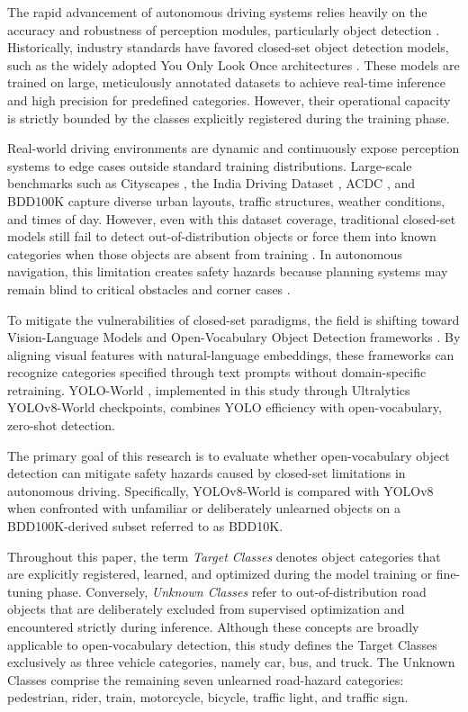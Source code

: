 \documentclass[conference]{IEEEtran}
\begin{document}
The rapid advancement of autonomous driving systems relies heavily on the accuracy and robustness of perception modules, particularly object detection \cite{Jebamikyous2022Autonomous, Pravallika2024Deep}. Historically, industry standards have favored closed-set object detection models, such as the widely adopted You Only Look Once architectures \cite{Redmon2015You, Terven2023A}. These models are trained on large, meticulously annotated datasets to achieve real-time inference and high precision for predefined categories. However, their operational capacity is strictly bounded by the classes explicitly registered during the training phase.

Real-world driving environments are dynamic and continuously expose perception systems to edge cases outside standard training distributions. Large-scale benchmarks such as Cityscapes \cite{Cordts2016Cityscapes}, the India Driving Dataset \cite{Varma2018IDD}, ACDC \cite{Sakaridis2021ACDC}, and BDD100K \cite{Yu2018BDD100K} capture diverse urban layouts, traffic structures, weather conditions, and times of day. However, even with this dataset coverage, traditional closed-set models still fail to detect out-of-distribution objects or force them into known categories when those objects are absent from training \cite{Dhamija2020The, Li2025Out-of-distribution}. In autonomous navigation, this limitation creates safety hazards because planning systems may remain blind to critical obstacles and corner cases \cite{Li2022CODA, Chen2025INSIGHT}.

To mitigate the vulnerabilities of closed-set paradigms, the field is shifting toward Vision-Language Models and Open-Vocabulary Object Detection frameworks \cite{Radford2021Learning, Li2024From}. By aligning visual features with natural-language embeddings, these frameworks can recognize categories specified through text prompts without domain-specific retraining. YOLO-World \cite{Cheng2024YOLO-World}, implemented in this study through Ultralytics YOLOv8-World checkpoints, combines YOLO efficiency with open-vocabulary, zero-shot detection.




The primary goal of this research is to evaluate whether open-vocabulary object detection can mitigate safety hazards caused by closed-set limitations in autonomous driving. Specifically, YOLOv8-World is compared with YOLOv8 when confronted with unfamiliar or deliberately unlearned objects on a BDD100K-derived subset referred to as BDD10K.

Throughout this paper, the term \textit{Target Classes} denotes object categories that are explicitly registered, learned, and optimized during the model training or fine-tuning phase. Conversely, \textit{Unknown Classes} refer to out-of-distribution road objects that are deliberately excluded from supervised optimization and encountered strictly during inference. Although these concepts are broadly applicable to open-vocabulary detection, this study defines the Target Classes exclusively as three vehicle categories, namely car, bus, and truck. The Unknown Classes comprise the remaining seven unlearned road-hazard categories: pedestrian, rider, train, motorcycle, bicycle, traffic light, and traffic sign.
\end{document}
